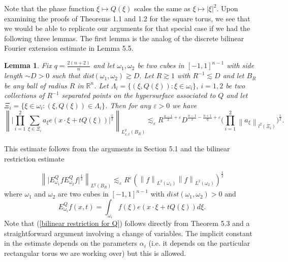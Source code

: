 \documentclass[11pt]{amsart}
\numberwithin{equation}{section}
\newcommand\norm[1]{\left\lVert#1\right\rVert}
\newcommand{\lpnorm}[3]{\norm{#1}_{L^{#2}(#3)}}
\newcommand{\litlpnorm}[3]{\norm{#1}_{l^{#2}(#3)}}
\newtheorem{lemma}[theorem]{Lemma}
\begin{document}
Note that the phase function $\xi \mapsto Q(\xi)$ scales the same as $\xi \mapsto |\xi|^2$. Upon examining the proofs of Theorems 1.1 and 1.2 for the square torus, we see that we would be able to replicate our arguments for that special case if we had the following three lemmas. The first lemma is the analog of the discrete bilinear Fourier extension estimate in Lemma 5.5.
\begin{lemma}
    Fix $q = \frac{2(n+2)}{n}$ and let $\omega_1, \omega_2$ be two cubes in $[-1,1]^{n-1}$ with side length $\sim D > 0$ such that dist$(\omega_1, \omega_2) \gtrsim D$. Let $R \gtrsim 1$ with $R^{-1} \lesssim D$ and let $B_{R}$ be any ball of radius $R$ in $\mathbb{R}^n$. Let $\Lambda_i = \{(\xi, Q(\xi)) :   \xi \in \omega_i \}$, $i  =1,2$ be two collections of $R^{-1}$ separated points on the hypersurface associated to $Q$ and let $\Xi_i = \{\xi \in \omega_i : (\xi, Q(\xi)) \in \Lambda_i \}$. Then for any $\varepsilon > 0$ we have
    \begin{equation} \label{bilinear exponential sum estimate for Q}
        \norm{\Big| \prod_{i = 1}^{2} \sum_{\xi \in \Xi_i}a_{\xi} e(x \cdot \xi + tQ(\xi)) \Big|^{\frac{1}{2}}}_{L_{x,t}^{q}(B_R)} \lesssim_{\varepsilon} R^{\frac{n-1}{2} + \varepsilon} D^{\frac{n-1}{2} - \frac{n+1}{q} + \varepsilon} \Big( \prod_{i = 1}^{2} \litlpnorm{a_\xi}{2}{\Xi_i} \Big)^{\frac{1}{2}}.
    \end{equation}
\end{lemma}
\noindent This estimate follows from the arguments in Section 5.1 and the bilinear restriction estimate

\begin{equation}\label{bilinear restriction for Q}
    \lpnorm{\big|E^{Q}_{\omega_1}fE^{Q}_{\omega_2}f \big|^{\frac{1}{2}}}{q}{B_{R}} \lesssim_{\varepsilon} R^{\varepsilon}\left( \lpnorm{f}{2}{\omega_1}\lpnorm{f}{2}{\omega_2}\right)^{\frac{1}{2}}
\end{equation}
where $\omega_1$ and $\omega_2$ are two cubes in $[-1,1]^{n-1}$ with $dist(\omega_1, \omega_2) > 0$ and 
\begin{equation*}
    E^{Q}_{\omega_i}f(x,t) = \int_{\omega_i}f(\xi)e(x\cdot \xi + tQ(\xi))d\xi.
\end{equation*}
Note that (\ref{bilinear restriction for Q}) follows directly from Theorem 5.3 and a straightforward argument involving a change of variables. The implicit constant in the estimate depends on the parameters $\alpha_i$ (i.e. it depends on the particular rectangular torus we are working over) but this is allowed. 
\end{document}

